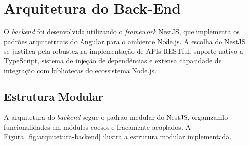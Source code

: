 \section{Arquitetura do Back-End}

O \textit{backend} foi desenvolvido utilizando o \textit{framework} NestJS, que implementa os padrões arquiteturais do Angular para o ambiente Node.js. A escolha do NestJS se justifica pela robustez na implementação de APIs RESTful, suporte nativo a TypeScript, sistema de injeção de dependências e extensa capacidade de integração com bibliotecas do ecossistema Node.js.

\subsection{Estrutura Modular}

A arquitetura do \textit{backend} segue o padrão modular do NestJS, organizando funcionalidades em módulos coesos e fracamente acoplados. A Figura~\ref{fig:arquitetura-backend} ilustra a estrutura modular implementada.

